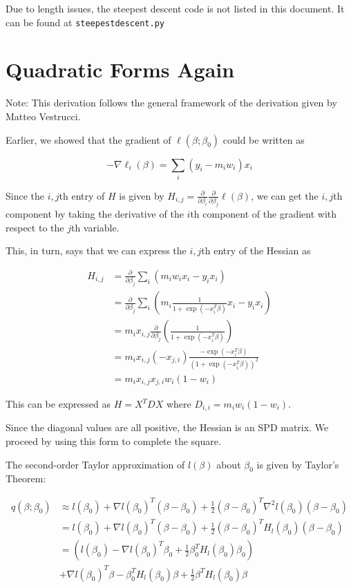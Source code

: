 \documentclass{article}
\begin{document}
Due to length issues, the steepest descent code is not listed in this document.
It can be found at \texttt{steepestdescent.py} 

\section{Quadratic Forms Again}

Note: This derivation follows the general framework of the derivation given by
Matteo Vestrucci.

Earlier, we showed that the gradient of $\ell(\beta ; \beta_0)$ could be written as

\[
    -\nabla \ell_i(\beta) = \sum\limits_i (y_i - m_iw_i) x_i
\]

Since the $i,j$th entry of $H$ is given by $H_{i,j} = \frac{\partial}{\partial
  \beta_i}\frac{\partial}{\partial \beta_j} \ell(\beta)$, we can get the
$i,j$th component by taking the derivative of the $i$th component of the
gradient with respect to the $j$th variable.

This, in turn, says that we can express the $i,j$th entry of the Hessian as

\begin{align*}
  H_{i,j} &= \frac{\partial}{\partial \beta_j} \sum\limits_i \left( m_i w_i x_i -
            y_i x_i \right) \\
          &= \frac{\partial}{\partial \beta_j} \sum\limits_i \left( m_i \frac{1}{1 + \exp(-x_i^T\beta)} x_i -
            y_i x_i \right)\\
          &= m_i x_{i,j}\frac{\partial}{\partial \beta_j} \left( \frac{1}{1 + \exp(-x_i^T\beta)} \right)\\
          &= m_i x_{i,j}(-x_{j,i})\frac{-\exp(-x_i^T\beta)}{(1 + \exp(-x_i^T\beta))^2}\\
          &= m_i x_{i,j}x_{j,i} w_i (1 - w_i)
\end{align*}

This can be expressed as $H = X^TDX$ where $D_{i,i} = m_i w_i (1 - w_i)$.

Since the diagonal values are all positive, the Hessian is an SPD matrix. We
proceed by using this form to complete the square.

The second-order Taylor approximation of $l(\beta)$ about $\beta_0$ is given by
Taylor's Theorem:

\begin{align*}
  q(\beta; \beta_0)
  &\approx l(\beta_0) + \nabla l(\beta_0)^T (\beta - \beta_0) +
             \frac{1}{2} (\beta - \beta_0)^T  \nabla^2 l(\beta_0) (\beta - \beta_0) \\
  &= l(\beta_0) + \nabla l(\beta_0)^T(\beta - \beta_0) + \frac{1}{2}(\beta - \beta_0)^T
             H_l(\beta_0) (\beta - \beta_0)\\
  &= \left(  l(\beta_0) -  \nabla l(\beta_0)^T \beta_0 + \frac{1}{2} \beta_0^T H_l(\beta_0) \beta_0 \right)\\
  &+ \nabla l(\beta_0)^T \beta - \beta_0^T H_l(\beta_0) \beta + \frac{1}{2} \beta^T H_l(\beta_0) \beta
 \end{align*}
\end{document}
